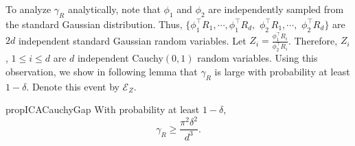 \documentclass[11pt]{article}
\newcommand{\EZ}{\mathcal{E}_{Z}}
\begin{document}
To analyze $\gamma_R$ analytically,
note that $\phi_1$ and $\phi_2$ are independently sampled from the  standard Gaussian distribution. 
Thus, $\{\phi_1^{\top}R_1, \cdots, \phi_1^{\top}R_d,$ $\phi_2^{\top}R_1, \cdots,$ $\phi_2^{\top}R_d\}$ are $2d$ independent standard Gaussian random variables. 
Let $Z_i = \frac{\phi_1^{\top}R_i}{\phi_2^{\top}R_i}$. Therefore, $Z_i$, $1\le i\le d$ are $d$ independent Cauchy$(0,1)$ random variables. Using this observation, we show in following lemma that $\gamma_R$ is large with probability at least $1-\delta$. Denote this event by $\EZ$.
\begin{restatable}{prop}{ICACauchyGap}
	\label{prop:CauchyGap}
	With probability at least $1-\delta$,
	\[
	\gamma_R \ge \frac{\pi^2\delta^2}{d^3}.
	\]
\end{restatable}
\end{document}
